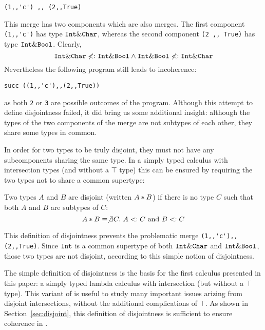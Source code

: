 \begin{lstlisting}
(1,,'c') ,, (2,,True)
\end{lstlisting}

\noindent This merge has two components which are also merges. 
The first component \lstinline{(1,,'c')} has type $\texttt{Int} \&
\texttt{Char}$, whereas the second component \lstinline{(2 ,, True)} has type
$\texttt{Int} \& \texttt{Bool}$. Clearly,
\[ \texttt{Int} \& \texttt{Char} \not <: \texttt{Int} \& \texttt{Bool} \wedge \texttt{Int} \& \texttt{Bool} \not <: \texttt{Int} \& \texttt{Char} \]
Nevertheless the following program still leads to
incoherence:
\begin{lstlisting}
succ ((1,,'c'),,(2,,True))
\end{lstlisting}
as both \lstinline{2} or \lstinline{3} are possible outcomes
of the program. Although this attempt to define disjointness failed,
it did bring us some additional insight: although the types of the two
components of the merge are not subtypes of each other, they share
some types in common.

In order for two types to be truly disjoint, they must not have any
subcomponents sharing the same type. In a simply typed calculus with intersection
types (and without a $\top$ type) this can be ensured by requiring the two types 
not to share a common supertype: 

\begin{definition}
  Two types $A$ and $B$ are disjoint
  (written $A * B$) if there is no type $C$ such that both $A$ and $B$ are
  subtypes of $C$:
  \[A * B \equiv \not\exists C.~A <: C~\text{and}~B<: C\]
\end{definition}\label{def:simple_dis}

\noindent This definition of disjointness prevents the problematic merge
\lstinline$(1,,'c'),,(2,,True)$. Since $\texttt{Int}$ is a
common supertype of both $\texttt{Int} \& \texttt{Char}$ and $\texttt{Int}
\& \texttt{Bool}$, those two types are not disjoint, according to this
simple notion of disjointness.

The simple definition of disjointness is the basis for the first calculus 
presented in this paper: a simply typed lambda calculus with intersection 
(but without a $\top$ type). 
This variant of \name is useful to study many 
important issues arizing from disjoint intersections, without the additional 
complications of $\top$. As shown in Section~\ref{sec:disjoint}, this
definition of disjointness is sufficient to ensure coherence in \name.

